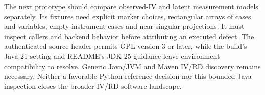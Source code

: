 The next prototype should compare observed-IV and latent measurement models
separately. Its fixtures need explicit marker choices, rectangular arrays of
cases and variables, empty-instrument cases and near-singular projections. It must inspect
callers and backend behavior before attributing an executed defect. The
authenticated source header permits GPL version 3 or later, while the build's
Java 21 setting and README's JDK 25 guidance leave environment compatibility
to resolve. Generic Java/JVM and Maven IV/RD discovery remains necessary.
Neither a favorable Python reference decision nor this bounded Java inspection
closes the broader IV/RD software landscape.
